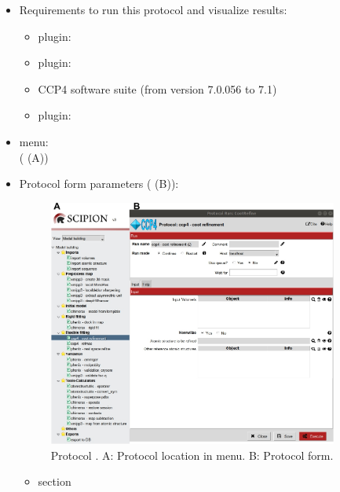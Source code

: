 \begin{itemize}
  \item Requirements to run this protocol and visualize results:
    \begin{itemize}
        \item \scipion plugin: 
        \item \scipion plugin: 
        \item CCP4 software suite (from version 7.0.056 to 7.1)
        \item \scipion plugin: 
    \end{itemize}
  \item \scipion menu:\\
    ( (A))
  
  \item Protocol form parameters ( (B)):
  
    \begin{figure}[H]
     \centering 
     \captionsetup{width=.9\linewidth} 
     \includegraphics[width=0.90\textwidth]{Images_appendix/Fig119.pdf}
     \caption{Protocol . A: Protocol location in \scipion menu. B: Protocol form.}
     \label{fig:app_protocol_coot_1}
    \end{figure}
    
    \begin{itemize}
     \item {} section


\end{itemize}
\end{itemize}
